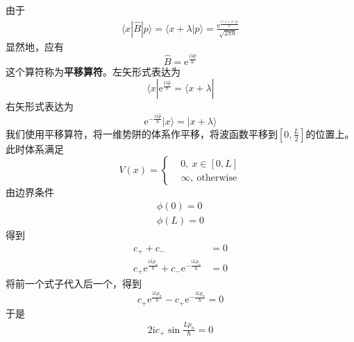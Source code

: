         由于
        \begin{equation}\begin{aligned}
            \langle x|\hat{B}| p \rangle = \langle x+\lambda |p\rangle = \frac {\mathrm{e}^{\frac {\mathrm{i}(x+\lambda)p}{\hbar}}}{\sqrt{2\pi\hbar}}
        \end{aligned}\end{equation}
        显然地，应有
        \begin{equation}
            \hat{B} = \mathrm{e}^{\frac {\mathrm{i}\lambda \hat{p}}{\hbar}}
        \end{equation}
        这个算符称为\textbf{平移算符}。左矢形式表达为
        \[ \langle x| \mathrm{e}^{\frac {\mathrm{i}\lambda \hat{p}}{\hbar}} = \langle x+\lambda| \]
        右矢形式表达为
        \[ \mathrm{e}^{-\frac {\mathrm{i}\lambda \hat{p}}{\hbar}} | x\rangle = |x+\lambda \rangle \]
        我们使用平移算符，将一维势阱的体系作平移，将波函数平移到$[0,\frac L2]$的位置上。此时体系满足
        \begin{equation}
            V(x) = \left \{
                \begin{aligned}
                    &0,\ x\in [0, L]\\
                    &\infty, \ \mathrm{otherwise}
                \end{aligned}
                \right.
        \end{equation}
        由边界条件
        \begin{equation}\begin{aligned}
            \phi(0)= 0\\
            \phi(L) = 0
        \end{aligned}\end{equation}
        得到
        \begin{equation}\begin{aligned}
            c_+ +c_- &= 0\\
            c_+\mathrm{e}^{\frac {\mathrm{i}Lp_n}{\hbar}}+c_-\mathrm{e}^{-\frac {\mathrm{i}Lp_n}{\hbar}} &= 0
        \end{aligned}\end{equation}
        将前一个式子代入后一个，得到
        \[ c_+\mathrm{e}^{\frac {\mathrm{i}Lp_n}{\hbar}}-c_+ \mathrm{e}^{-\frac {\mathrm{i}Lp_n}{\hbar}} = 0 \]
        于是
        \begin{equation}\begin{aligned}
            2\mathrm{i}c_+ \sin{\frac {Lp_n}{\hbar}} = 0
        \end{aligned}\end{equation}
